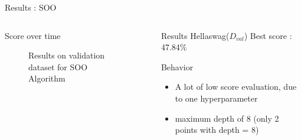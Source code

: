 \begin{frame}{Results : SOO} 
    
    \begin{columns}
    
        \begin{column}{0.6\textwidth}
            \begin{block}{Score over time}
                \begin{figure}
                    \centering
                    
                    \caption{Results on validation dataset for SOO Algorithm}
                \end{figure}
            
            \end{block}   
        \end{column}

        \begin{column}{0.4\textwidth}
            \begin{block}{Results}
                Hellaswag($D_{val}$) Best score : 47.84\%        
            \end{block}

            \begin{block}{Behavior}

                \begin{itemize}
                    \item A lot of low score evaluation, due to one hyperparameter
                    \item maximum depth of 8 (only 2 points with depth = 8)
                \end{itemize}

            \end{block}
             
        \end{column}
    \end{columns}    
\end{frame}


